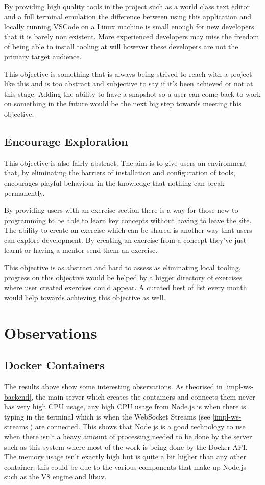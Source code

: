 \documentclass[12pt, a4paper]{extreport}
\begin{document}
By providing high quality tools in the project such as a world class text editor and a full terminal emulation the difference between using this application and locally running VSCode on a Linux machine is small enough for new developers that it is barely non existent. More experienced developers may miss the freedom of being able to install tooling at will however these developers are not the primary target audience.

This objective is something that is always being strived to reach with a project like this and is too abstract and subjective to say if it's been achieved or not at this stage. Adding the ability to have a snapshot so a user can come back to work on something in the future would be the next big step towards meeting this objective.

\subsection{Encourage Exploration}

This objective is also fairly abstract. The aim is to give users an environment that, by eliminating the barriers of installation and configuration of tools, encourages playful behaviour in the knowledge that nothing can break permanently.

By providing users with an exercise section there is a way for those new to programming to be able to learn key concepts without having to leave the site. The ability to create an exercise which can be shared is another way that users can explore development. By creating an exercise from a concept they've just learnt or having a mentor send them an exercise.

This objective is as abstract and hard to assess as eliminating local tooling, progress on this objective would be helped by a bigger directory of exercises where user created exercises could appear. A curated best of list every month would help towards achieving this objective as well. 

\section{Observations}

\subsection{Docker Containers}

The results above show some interesting observations. As theorised in \ref{impl-ws-backend}, the main server which creates the containers and connects them never has very high CPU usage, any high CPU usage from Node.js is when there is typing in the terminal which is when the WebSocket Streams (see \ref{impl-ws-streams}) are connected. This shows that Node.js is a good technology to use when there isn't a heavy amount of processing needed to be done by the server such as this system where most of the work is being done by the Docker API. The memory usage isn't exactly high but is quite a bit higher than any other container, this could be due to the various components that make up Node.js such as the V8 engine and libuv.
\end{document}
